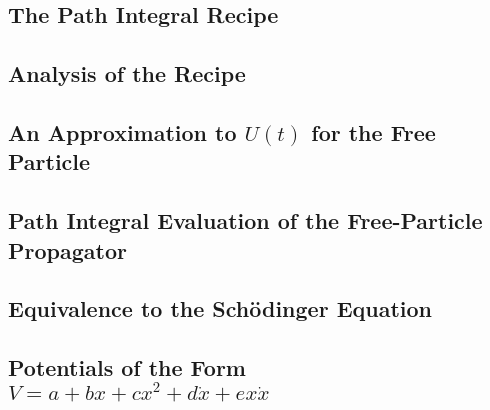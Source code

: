 \subsection{The Path Integral Recipe}

\subsection{Analysis of the Recipe}

\subsection[An Approximation to the Propagator for the Free Particle]{An Approximation to $U(t)$ for the Free Particle}

\subsection{Path Integral Evaluation of the Free-Particle Propagator}

\subsection{Equivalence to the Sch\"odinger Equation}

\subsection[A Class of Potentials]{Potentials of the Form $V = a + bx + cx^2 + d\dot{x} + ex\dot{x}$}
